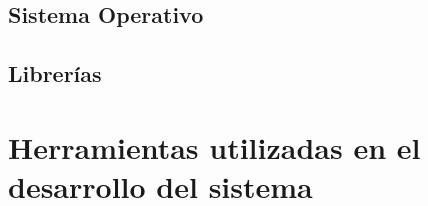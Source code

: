 \subsection{Sistema Operativo}
%
%
%
%
%

\subsection{Librerías}


\section{Herramientas utilizadas en el desarrollo del sistema}

